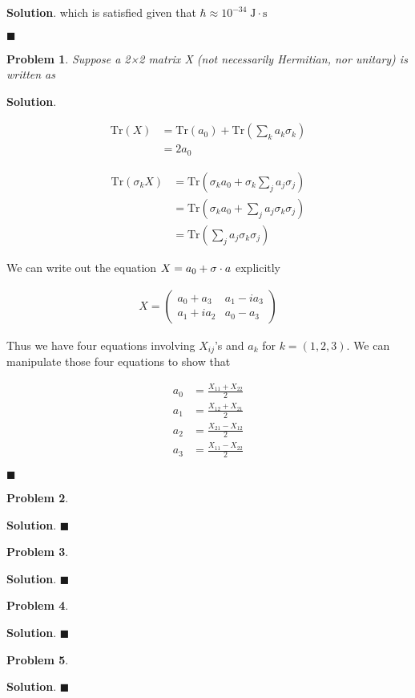 \documentclass[12pt]{article}
\newtheorem{p}{Problem}
\theoremstyle{definition}
\newenvironment{s}{%
        \begin{trivlist} \item \textbf{Solution}. }{%
            \hspace*{\fill} $\blacksquare$\end{trivlist}}%
\begin{document}
{\begin{s}
which is satisfied given that $\hbar \approx 10^{-34} \;\mathrm{J\cdot s}$


\end{s}

\begin{p}
Suppose a 2×2 matrix X (not necessarily Hermitian, nor unitary) is written as
\end{p}

\begin{s} 


\begin{align*}
\mathrm{Tr}(X) &= \mathrm{Tr}(a_{0}) + \mathrm{Tr}\left(\sum_k a_k\sigma_k\right)\\
&= 2a_{0}
\end{align*}

\begin{align*}
\mathrm{Tr}(\sigma_{k}X) &= \mathrm{Tr}\left(\sigma_{k}a_{0} + \sigma_{k}\sum_j a_{j}\sigma_j\right)\\
&= \mathrm{Tr}\left(\sigma_{k}a_{0} + \sum_j a_{j}\sigma_{k}\sigma_j\right)\\
&= \mathrm{Tr}\left(\sum_j a_{j}\sigma_{k}\sigma_j\right)
\end{align*}

We can write out the equation $X = a_{0} + \bold{\sigma}\cdot a$ explicitly

\begin{align*}
X =
\begin{pmatrix}
a_0 + a_3 & a_1 - ia_3\\
a_1+ia_2 & a_0 - a_3
\end{pmatrix}
\end{align*}

Thus we have four equations involving $X_{ij}$'s and $a_k$ for $k = (1,2,3)$. We can manipulate those four equations to show that

\begin{align*}
a_0 &= \frac{X_{11}+X_{22}}{2}\\
a_1 &= \frac{X_{12}+X_{21}}{2}\\
a_2 &= \frac{X_{21}-X_{12}}{2}\\
a_3 &= \frac{X_{11}-X_{22}}{2}
\end{align*}


\end{s}

\begin{p}

\end{p}

\begin{s} 
\end{s}

\begin{p}

\end{p}

\begin{s} 
\end{s}

\begin{p}

\end{p}

\begin{s} 
\end{s}

\begin{p}

\end{p}

\begin{s} 
\end{s}
\end{document}
